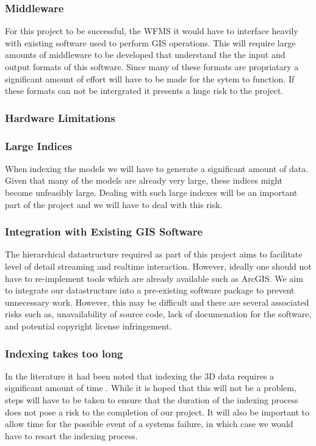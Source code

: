 \documentclass[12pt,a4paper]{article}
\begin{document}
\subsubsection*{Middleware}
For this project to be successful, the WFMS it would have to interface
heavily with existing software used to perform GIS operations. This will
require large amounts of middleware to be developed that understand the
the input and output formats of this software. Since many of these
formats are propriatary a significant amount of effort will have to
be made for the sytem to function. If these formats can not be intergrated
it presents a huge risk to the project.
\subsubsection*{Hardware Limitations}
\subsubsection*{Large Indices}
When indexing the models we will have to generate a significant amount of data. Given that many of the models are already very large, these indices might become unfeasibly large. Dealing with such large indexes will be an important part of the project and we will have to deal with this risk.
\subsubsection*{Integration with Existing GIS Software}
The hierarchical datastructure required as part of this project aims to facilitate level of detail streaming and realtime interaction. However, ideally one should not have to re-implement tools which are already available such as ArcGIS. We aim to integrate our datastructure into a pre-existing software package to prevent unnecessary work. However, this may be difficult and there are several associated risks such as, unavailability of source code, lack of documenation for the software, and potential copyright license infringement.
\subsubsection*{Indexing takes too long}
In the literature it had been noted that indexing the 3D data requires a significant amount of time \citep{interactivepointclouds}. While it is hoped that this will not be a problem, steps will have to be taken to ensure that the duration of the indexing process does not pose a risk to the completion of our project. It will also be important to allow time for the possible event of a systems failure, in which case we would have to resart the indexing process.
\end{document}
